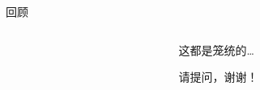 \begin{frame}{回顾}
  \begin{columns}
    \begin{column}{0.5\textwidth}
      \tableofcontents[pausesections]
    \end{column}
    \begin{column}{0.5\textwidth}
      \begin{block}{}
        \begin{center}
        \large 这都是笼统的\dots

        \huge \alert{请提问，谢谢！}
        \end{center}
      \end{block}
    \end{column}
  \end{columns}
\end{frame}


